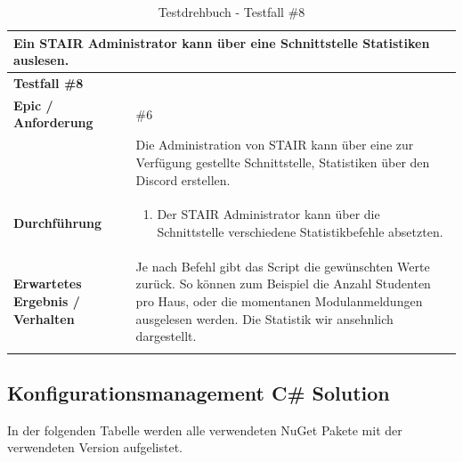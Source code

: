 \documentclass[a4paper, table]{article}
\begin{document}
\begin{longtable}[h]{|p{15em}|p{25em}|}
    \hline
    \multicolumn{2}{|l|}{\textbf{Ein STAIR Administrator kann über eine Schnittstelle Statistiken auslesen.}} \\
    \hline
    \multicolumn{2}{|l|}{\textbf{Testfall \#8}} \\
    \hline
    \textbf{Epic / Anforderung} & \#6 \\*
     & Die Administration von STAIR kann über eine zur Verfügung gestellte Schnittstelle, Statistiken über den Discord erstellen. \\
    \hline
    \textbf{Durchführung} &
    \begin{enumerate}
        \item Der STAIR Administrator kann über die Schnittstelle verschiedene Statistikbefehle absetzten.
    \end{enumerate}\\
    \hline
    \textbf{Erwartetes Ergebnis / Verhalten} & Je nach Befehl gibt das Script die gewünschten Werte zurück.
    So können zum Beispiel die Anzahl Studenten pro Haus, oder die momentanen Modulanmeldungen ausgelesen werden.
    Die Statistik wir ansehnlich dargestellt. \\
    \hline
    \caption{Testdrehbuch - Testfall \#8}
\end{longtable}
\clearpage

\subsection{Konfigurationsmanagement C\# Solution}
In der folgenden Tabelle werden alle verwendeten NuGet Pakete mit der verwendeten Version aufgelistet.
\end{document}
